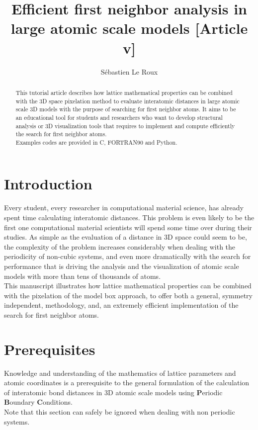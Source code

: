 \documentclass[9pt,tutorial]{livecoms}
\title{Efficient first neighbor analysis in large atomic scale models [Article v\versionnumber]}
\author[1*\authfn{1}]{Sébastien Le Roux}
\affil{Institut de Physique et Chimie des Matériaux de Strasbourg, Université de Strasbourg, CNRS UMR 7504, 23 rue de Loess, BP 43, F-67034 Strasbourg Cedex 2, France}
\begin{document}
\begin{frontmatter}
\maketitle

\begin{abstract}
This tutorial article describes how lattice mathematical properties can be combined with the 3D space pixelation method 
to evaluate interatomic distances in large atomic scale 3D models with the purpose of searching for first neighbor atoms. 
It aims to be an educational tool for students and researchers who want to develop structural analysis or 3D visualization tools 
that requires to implement and compute efficiently the search for first neighbor atoms. \\
Examples codes are provided in C, FORTRAN90 and Python. 
\end{abstract}

\end{frontmatter}


\section{Introduction}
\label{intro}

Every student, every researcher in computational material science, has already spent time calculating interatomic distances. 
This problem is even likely to be the first one computational material scientists will spend some time over during their studies. 
As simple as the evaluation of a distance in 3D space could seem to be, the complexity of the problem increases considerably 
when dealing with the periodicity of non-cubic systems, and even more dramatically with the search for performance that is driving the analysis
and the visualization of atomic scale models with more than tens of thousands of atoms. \\[0.25cm]
This manuscript illustrates how lattice mathematical properties can be combined with the pixelation of the model box approach, to offer 
both a general, symmetry independent, methodology, and, an extremely efficient implementation of the search for first neighbor atoms. 

\section{Prerequisites}
\label{mat}
Knowledge and understanding of the mathematics of lattice parameters and atomic coordinates is a prerequisite to the general formulation 
of the calculation of interatomic bond distances in 3D atomic scale models using {\bf{P}}eriodic {\bf{B}}oundary {\bf{C}}onditions. \\
Note that this section can safely be ignored when dealing with non periodic systems. 
\end{document}
